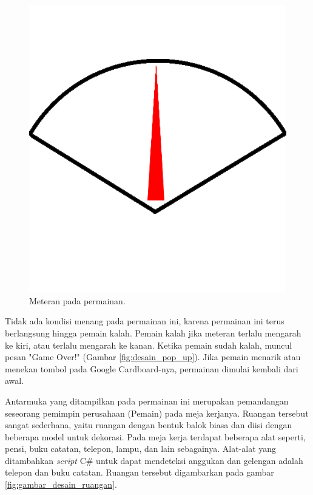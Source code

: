 \begin{figure}[htbp]
\centering
\includegraphics[scale=0.3]{Gambar/HUDBar.png}
\caption{Meteran pada permainan.}
\label{fig:meteran_permainan}
\end{figure}

Tidak ada kondisi menang pada permainan ini, karena permainan ini terus berlangsung hingga pemain kalah. Pemain kalah jika meteran terlalu mengarah ke kiri, atau terlalu mengarah ke kanan. Ketika pemain sudah kalah, muncul pesan "Game Over!" (Gambar \ref{fig:desain_pop_up}). Jika pemain menarik atau menekan tombol pada Google Cardboard-nya, permainan dimulai kembali dari awal. 

Antarmuka yang ditampilkan pada permainan ini merupakan pemandangan seseorang pemimpin perusahaan (Pemain) pada meja kerjanya. Ruangan tersebut sangat sederhana, yaitu ruangan dengan bentuk balok biasa dan diisi dengan beberapa model untuk dekorasi. Pada meja kerja terdapat beberapa alat seperti, pensi, buku catatan, telepon, lampu, dan lain sebagainya. Alat-alat yang ditambahkan \textit{script} C\# untuk dapat mendeteksi anggukan dan gelengan adalah telepon dan buku catatan. Ruangan tersebut digambarkan pada gambar \ref{fig:gambar_desain_ruangan}.

